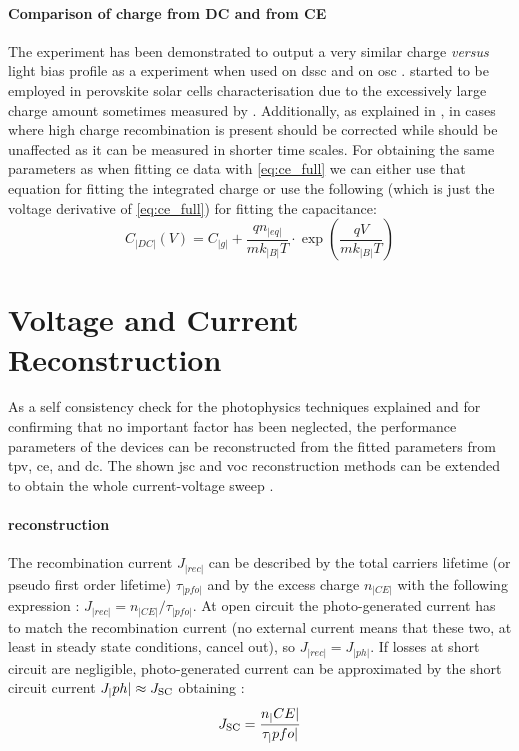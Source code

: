 	\paragraph{Comparison of charge from DC and from CE}
	The  experiment has been demonstrated to output a very similar charge \textsl{versus} light bias profile as a  experiment when used on \gls{dssc} \cite{ORegan2005,Barnes2013} and on \gls{osc} \cite{Shuttle2008a}.
	 started to be employed in perovskite solar cells characterisation due to the excessively large charge amount sometimes measured by  \cite{Wheeler2017,ORegan2015b}.
	Additionally, as explained in , in cases where high charge recombination is present  should be corrected while  should be unaffected as it can be measured in shorter time scales.
	For obtaining the same parameters as when fitting \gls{ce} data with \cref{eq:ce_full} we can either use that equation for fitting the integrated charge or use the following (which is just the voltage derivative of \cref{eq:ce_full}) for fitting the capacitance:
	\begin{equation}\label{eq:dc_full}
		C_|DC|(V) = C_|g| + \frac{qn_|eq|}{mk_|B|T} \cdot \exp(\frac{qV}{mk_|B|T})
	\end{equation}

	\FloatBarrier
	\newpage
\section{Voltage and Current Reconstruction}
	As a self consistency check for the photophysics techniques explained and for confirming that no important factor has been neglected, the performance parameters of the devices can be reconstructed from the fitted parameters from \gls{tpv}, \gls{ce}, and \gls{dc}.
	The shown \gls{jsc} and \gls{voc} reconstruction methods can be extended to obtain the whole current-voltage sweep \cite{Maurano2011}.

	\paragraph{ reconstruction}\label{jsc_reconstruction}
	The recombination current $J_|rec|$ can be described by the total carriers lifetime (or pseudo first order lifetime) $\tau_|pfo|$ and by the excess charge $n_|CE|$ with the following expression \cite{Wheeler2017,Du2018}: $J_|rec| = n_|CE| / \tau_|pfo|$.
	At open circuit the photo\hyp{}generated current has to match the recombination current (no external current means that these two, at least in steady state conditions, cancel out), so $J_|rec| = J_|ph|$.
	If losses at short circuit are negligible, photo\hyp{}generated current can be approximated by the short circuit current $J_|ph| \approx J_\mathrm{SC}$ obtaining \cite{ORegan2015b}:
	\begin{equation}\label{eq:reconstruction_jsc}
		J_\mathrm{SC} = \frac{n_|CE|}{\tau_|pfo|}
	\end{equation}

